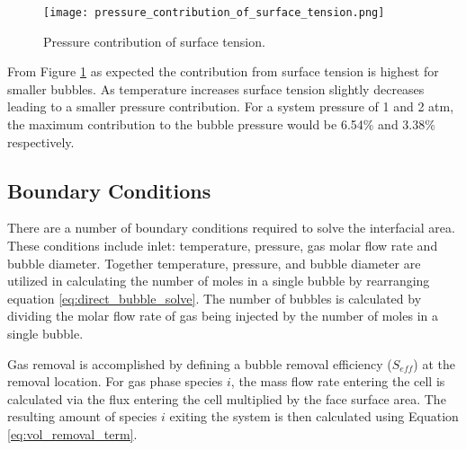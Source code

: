 \begin{figure}[ht]
  \centering
  \texttt{[image: pressure\_contribution\_of\_surface\_tension.png]}\\
  \caption{Pressure contribution of surface tension.}
  \label{fig:pressure_contribution_of_surface_tension}
\end{figure} 

From Figure \ref{fig:pressure_contribution_of_surface_tension} as expected the contribution from surface tension is highest for smaller bubbles. As temperature increases surface tension slightly decreases leading to a smaller pressure contribution. For a system pressure of 1 and 2 atm, the maximum contribution to the bubble pressure would be 6.54\% and 3.38\% respectively. 

\subsection{Boundary Conditions}\label{ch:bubble_BC}
There are a number of boundary conditions required to solve the interfacial area. These conditions include inlet: temperature, pressure, gas molar flow rate and bubble diameter. Together temperature, pressure, and bubble diameter are utilized in calculating the number of moles in a single bubble by rearranging equation \ref{eq:direct_bubble_solve}. The number of bubbles is calculated by dividing the molar flow rate of gas being injected by the number of moles in a single bubble. 

Gas removal is accomplished by defining a bubble removal efficiency ($S_{eff}$) at the removal location. For gas phase species $i$, the mass flow rate entering the cell is calculated via the flux entering the cell multiplied by the face surface area. The resulting amount of species $i$ exiting the system is then calculated using Equation \ref{eq:vol_removal_term}.












